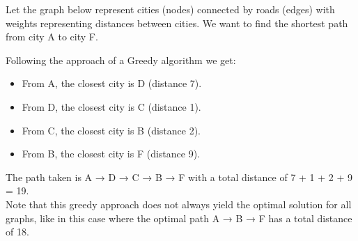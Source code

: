 \begin{eg}
    Let the graph below represent cities (nodes) connected by roads (edges) with weights representing distances between cities. We want to find the shortest path from city A to city F.
    \begin{center}
    \end{center}
    Following the approach of a Greedy algorithm we get:
    \begin{itemize}[itemsep=1pt,label=$\circ$]
        \item From A, the closest city is D (distance 7).
        \item From D, the closest city is C (distance 1).
        \item From C, the closest city is B (distance 2).
        \item From B, the closest city is F (distance 9).
    \end{itemize}
    The path taken is A → D → C → B → F with a total distance of 7 + 1 + 2 + 9 = 19. \\
    Note that this greedy approach does not always yield the optimal solution for all graphs, like in this case where the optimal path A → B → F has a total distance of 18.
\end{eg}

